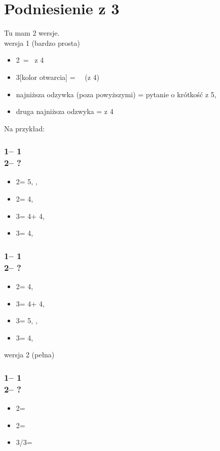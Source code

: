 \documentclass[12pt, a4paper]{report}
\begin{document}
\section*{\colorbox{blue!30}{Podniesienie z 3}}
 {
    Tu mam 2 wersje.\\
    {\large wersja 1 (bardzo prosta)}

    \begin{itemize}
        \item 2\nt\ = \inv\ z 4\major\ \nf
        \item 3[kolor otwarcia] = \nat\ \inv\ (z 4\major)
        \item najniższa odzywka (poza powyższymi) = pytanie o krótkość z 5\major, \gf
        \item druga najniższa odzwyka = \gf z 4\major
    \end{itemize}

    Na przykład:

    \subsubsection*{1\clubs -- 1\hearts \\ 2\hearts -- ?}
    \begin{itemize}
        \item 2\spades = 5\hearts, \gf, \lsf
        \item 2\nt = 4\hearts, \inv
        \item 3\clubs = 4\hearts + 4\clubs, \inv
        \item 3\diams = 4\hearts, \gf
    \end{itemize}

    \subsubsection*{1\clubs -- 1\spades \\ 2\spades -- ?}
    \begin{itemize}
        \item 2\nt = 4\spades, \inv
        \item 3\clubs = 4\spades + 4\clubs, \inv
        \item 3\diams = 5\spades, \gf, \lsf
        \item 3\hearts = 4\spades, \gf
    \end{itemize}

    {\large wersja 2 (pełna)}
    \subsubsection*{1\clubs -- 1\hearts\\
                    2\hearts -- ?}
    \begin{itemize}
        \item 2\spades = \gf
        \item 2\nt = \inv\ \spades
        \item 3\minor/3\hearts = \inv
    \end{itemize}

}
\end{document}
